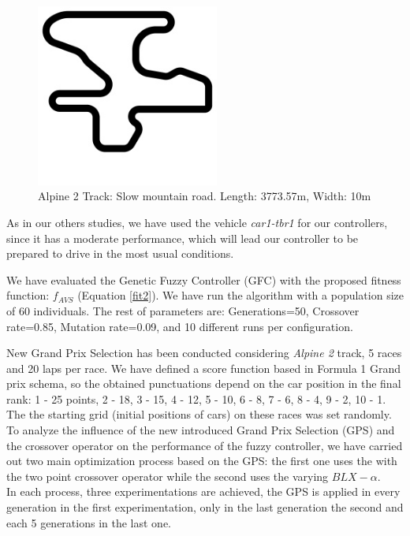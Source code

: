 \documentclass[10pt,journal,compsoc]{IEEEtran}
\begin{document}
\begin{figure}[!ht]	
	\begin{center}
		\includegraphics[width=6cm]{fig/alpine2.jpg}
		\caption{Alpine 2 Track: Slow mountain road. Length: 3773.57m, Width: 10m}
		\label{fig:alpine2_track}	
	\end{center}	
\end{figure}

As in our others studies, we have used the vehicle \textit{car1-tbr1} for our controllers, since it has a moderate performance, which will lead our controller to be prepared to drive in the most usual conditions.

We have evaluated the Genetic Fuzzy Controller (GFC) with the proposed fitness function: $f_{AVS}$ (Equation \ref{fit2}). We have run the algorithm with a population size of 60 individuals. The rest of parameters are: Generations=50, Crossover rate=0.85, Mutation rate=0.09, and 10 different runs per configuration.

New Grand Prix Selection has been conducted considering \textit{Alpine 2} track, 5 races and 20 laps per race. 
We have defined a score function based in Formula 1 Grand prix schema, so the obtained punctuations depend on the car position in the final rank: 1 - 25 points, 2 - 18, 3 - 15, 4 - 12, 5 - 10, 6 - 8, 7 - 6, 8 - 4, 9 - 2, 10 - 1. The the starting grid (initial positions of cars) on these races was set randomly.\\

To analyze the influence of the new introduced Grand Prix Selection (GPS) and the crossover operator on the performance of the fuzzy controller, we have carried out  two main optimization process based on the GPS: the first one uses the  with the two point crossover operator while the second uses the varying $BLX-\alpha$. \\
In each process, three experimentations are achieved, the GPS is applied in every generation in the first experimentation, only in the last generation the second and each 5 generations in the last one.
 
\end{document}
